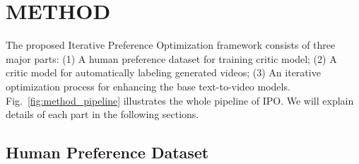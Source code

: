 \section{METHOD}
\label{sec:method} 

The proposed Iterative Preference Optimization framework consists of three major parts: (1) A human preference dataset for training critic model; (2) A critic model for automatically labeling generated videos; (3) An iterative optimization process for enhancing the base text-to-video models. Fig.~\ref{fig:method_pipeline} illustrates the whole pipeline of IPO. We will explain details of each part in the following sections. 



\subsection{Human Preference Dataset}
\label{collect dataset}

